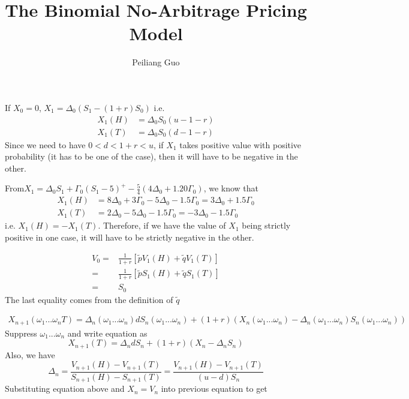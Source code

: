 \documentclass[12pt]{article}
\newenvironment{exercise}[2][Exercise]{\begin{trivlist}
		\item[\hskip \labelsep {\bfseries #1}\hskip \labelsep {\bfseries #2.}]}{\end{trivlist}}
\begin{document}
	
	\title{The Binomial No-Arbitrage Pricing Model}
	\author{Peiliang Guo}
	\maketitle
	\begin{exercise}{1}
	\end{exercise}
	If $X_0=0$, 
	$X_1=\Delta_0(S_1-(1+r)S_0)$
	i.e.\begin{align*}
	X_1(H) &= \Delta_0S_0(u-1-r)\\
	X_1(T) &= \Delta_0S_0(d-1-r)
	\end{align*}
	Since we need to have $0<d<1+r<u$, if $X_1$ takes positive value with positive probability (it has to be one of the case), then it will have to be negative in the other.
	\begin{exercise}{2}\end{exercise}
	From$X_1 = \Delta_0S_1+\Gamma_0(S_1-5)^+-\frac{5}{4}(4\Delta_0+1.20\Gamma_0)$, we know that
	\begin{align*}X_1(H) &= 8\Delta_0+3\Gamma_0-5\Delta_0-1.5\Gamma_0=3\Delta_0+1.5\Gamma_0\\
	X_1(T) &= 2\Delta_0-5\Delta_0-1.5\Gamma_0=-3\Delta_0-1.5\Gamma_0
	\end{align*}
	i.e. $X_1(H)=-X_1(T)$. Therefore, if we have the value of $X_1$ being strictly positive in one case, it will have to be strictly negative in the other.
	\begin{exercise}{3}\end{exercise}
	\begin{align*}V_0 =& \frac{1}{1+r}[\tilde{p}V_1(H)+\tilde{q}V_1(T)]\\
				=&\frac{1}{1+r}[\tilde{p}S_1(H)+\tilde{q}S_1(T)]\\
				=&S_0\end{align*}
	The last equality comes from the definition of $\tilde{q}$
	\begin{exercise}{4}\end{exercise}
	\begin{align*}
	X_{n+1}(\omega_1...\omega_nT)=\Delta_n(\omega_1...\omega_n)dS_n(\omega_1...\omega_n)+(1+r)\left(X_n(\omega_1...\omega_n)-\Delta_n(\omega_1...\omega_n)S_n(\omega_1...\omega_n)\right)
	\end{align*}
	Suppress $\omega_1...\omega_n$ and write equation as 
	$$X_{n+1}(T) = \Delta_ndS_n+(1+r)(X_n-\Delta_nS_n)$$
	Also, we have $$\Delta_n=\frac{V_{n+1}(H)-V_{n+1}(T)}{S_{n+1}(H)-S_{n+1}(T)}=\frac{V_{n+1}(H)-V_{n+1}(T)}{(u-d)S_n}$$
	Substituting equation above and $X_n=V_n$ into previous equation to get 
\end{document}
